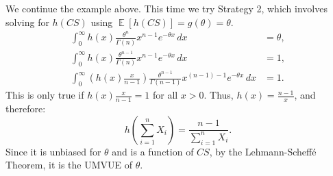 \documentclass{huhtakm-template-book-v2}
\DeclareMathOperator{\E}{\mathbb{E}}
\begin{document}
    \begin{eg}
        We continue the example above. This time we try Strategy 2, which involves solving for $h(CS)$ using $\E[h(CS)]=g(\theta)=\theta$.
        \begin{align*}
            \int_{0}^{\infty}h(x)\frac{\theta^{n}}{\Gamma(n)}x^{n-1}e^{-\theta x}\,dx&=\theta,\\
            \int_{0}^{\infty}h(x)\frac{\theta^{n-1}}{\Gamma(n)}x^{n-1}e^{-\theta x}\,dx&=1,\\
            \int_{0}^{\infty}\left(h(x)\frac{x}{n-1}\right)\frac{\theta^{n-1}}{\Gamma(n-1)}x^{(n-1)-1}e^{-\theta x}\,dx&=1.
        \end{align*} 
        This is only true if $h(x)\frac{x}{n-1}=1$ for all $x>0$. Thus, $h(x)=\frac{n-1}{x}$, and therefore:
        \begin{equation*}
            h\left(\sum_{i=1}^{n}X_{i}\right)=\frac{n-1}{\sum_{i=1}^{n}X_{i}}.
        \end{equation*}
        Since it is unbiased for $\theta$ and is a function of $CS$, by the Lehmann-Scheff\'e Theorem, it is the UMVUE of $\theta$.
    \end{eg}
    \newpage
    
\end{document}
